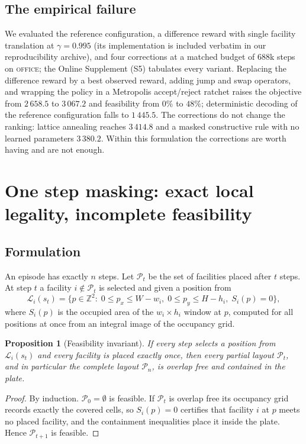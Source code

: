 \documentclass[preprint,12pt,authoryear]{elsarticle}
\newtheorem{prop}{Proposition}
\newcommand{\Z}{\mathbb{Z}}
\newcommand{\cL}{\mathcal{L}}
\newcommand{\cP}{\mathcal{P}}
\begin{document}
\subsection{The empirical failure}
\label{sec:improve_empirical}
We evaluated the reference configuration, a difference reward with
single facility translation at $\gamma=0.995$ (its implementation is included
verbatim in our reproducibility archive), and four corrections at a matched
budget of $688$k steps on \textsc{office}; the Online Supplement (S5)
tabulates every variant. Replacing the difference reward by a best observed
reward, adding jump and swap operators, and wrapping the policy in a
Metropolis accept/reject ratchet raises the objective from $2\,658.5$ to
$3\,067.2$ and feasibility from $0\%$ to $48\%$; deterministic decoding of the
reference configuration falls to $1\,445.5$. The corrections do not change the
ranking: lattice annealing reaches $3\,414.8$ and a masked constructive rule
with no learned parameters $3\,380.2$. Within this formulation the corrections
are worth having and are not enough.

\section{One step masking: exact local legality, incomplete feasibility}
\label{sec:construct}

\subsection{Formulation}
An episode has exactly $n$ steps. Let $\cP_t$ be the set of facilities placed
after $t$ steps. At step $t$ a facility $i\notin\cP_t$ is selected and given a
position from
\begin{equation}
\cL_i(s_t)=\Big\{p\in\Z^2:\;0\le p_x\le W-w_i,\;
0\le p_y\le H-h_i,\;S_i(p)=0\Big\},
\label{eq:legal}
\end{equation}
where $S_i(p)$ is the occupied area of the $w_i\times h_i$ window at $p$,
computed for all positions at once from an integral image of the occupancy grid.

\begin{prop}[Feasibility invariant]
\label{prop:invariant}
If every step selects a position from $\cL_i(s_t)$ and every facility is placed
exactly once, then every partial layout $\cP_t$, and in particular the complete
layout $\cP_n$, is overlap free and contained in the plate.
\end{prop}
\begin{proof}
By induction. $\cP_0=\emptyset$ is feasible. If $\cP_t$ is overlap free its
occupancy grid records exactly the covered cells, so $S_i(p)=0$ certifies that
facility $i$ at $p$ meets no placed facility, and the containment inequalities
place it inside the plate. Hence $\cP_{t+1}$ is feasible.
\end{proof}
\end{document}
